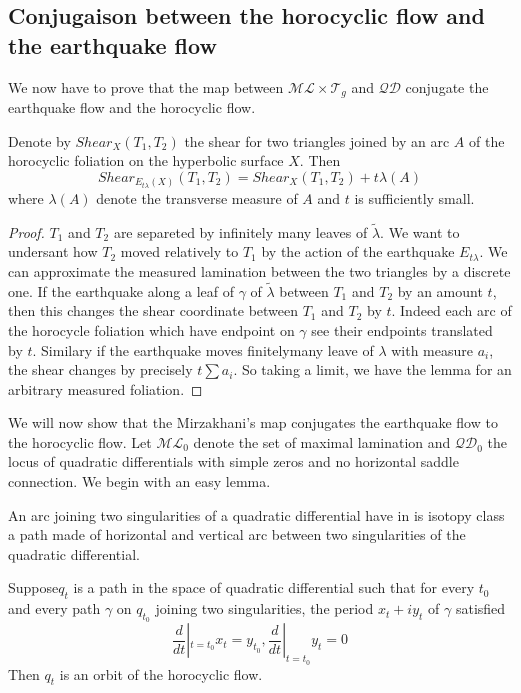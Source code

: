 \subsection{Conjugaison between the horocyclic flow and the earthquake flow}

We now have to prove that the map between $\mathcal{ML}\times \mathcal{T}_g $ and $\mathcal{QD}$ conjugate the earthquake flow and the horocyclic flow.

\begin{lem}\label{LemDer}
Denote by $Shear_X(T_1,T_2)$ the shear for two triangles joined by an arc $A$ of the horocyclic foliation on the hyperbolic surface $X$. Then \[
Shear_{E_{t \lambda}(X)}(T_1 ,T_2)= Shear_X(T_1,T_2)+t \lambda(A)
\]
where $\lambda(A)$ denote the transverse measure of $A$ and $t$ is sufficiently small.
\end{lem}

\begin{proof}
$T_1$ and $T_2$ are separeted by infinitely many leaves of $\tilde{\lambda}$. We want to undersant how $T_2$ moved relatively to $T_1$ by the action of the earthquake $E_{t \lambda}$.
We can approximate the measured lamination between the two triangles by a discrete one.
If the earthquake along a leaf of $\gamma$ of $\tilde{\lambda}$ between $T_1$ and $T_2$ by an amount $t$, then this changes the shear coordinate between $T_1$ and $T_2$ by $t$. Indeed each arc of the horocycle foliation which have endpoint on $\gamma$ see their endpoints translated by $t$.
Similary if the earthquake moves finitelymany leave of $\lambda$ with measure $a_i$, the shear changes by precisely $t \sum a_i$. So taking a limit, we have the lemma for an arbitrary measured foliation.
\end{proof}

We will now show that the Mirzakhani's map conjugates the earthquake flow to the horocyclic flow. Let $\mathcal{ML}_0$ denote the set of maximal lamination and $\mathcal{QD}_0$ the locus of quadratic differentials with simple zeros and no horizontal saddle connection. We begin with an easy lemma.

\begin{lem}
An arc joining two singularities of a quadratic differential have in is isotopy class a path made of horizontal and vertical arc between two singularities of the quadratic differential.
\end{lem}

\begin{cor}
Suppose$q_t$ is a path in the space of quadratic differential such that for every $t_0$ and every path $\gamma$ on $q_{t_0}$ joining two singularities, the period $x_t + i y_t$ of $\gamma$ satisfied \[
\frac{d}{dt}|_{t=t_0} x_t = y_{t_0}, \frac{d}{dt}|_{t=t_0} y_t = 0
\]
Then $q_t$ is an orbit of the horocyclic flow.
\end{cor}

